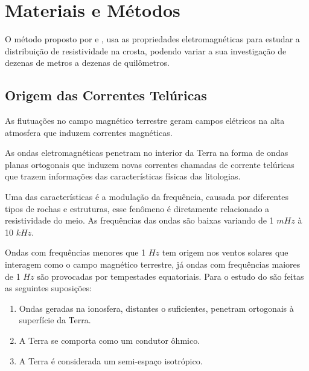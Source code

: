 \chapter{Materiais e Métodos}
    \label{cap-materiais}    
    
    O método \MT proposto por \citeauthor{tikhonov50} \citeyearpar{tikhonov50} e
    \citeauthor{cagniard53} \citeyearpar{cagniard53}, usa as propriedades
    eletromagnéticas para estudar a distribuição de resistividade na crosta, 
    podendo variar a sua investigação de dezenas de metros a dezenas de 
    quilômetros.
    
    \section{Origem das Correntes Telúricas}
    
    As flutuações no campo magnético terrestre geram campos elétricos na alta atmosfera que induzem correntes magnéticas.
    
    As ondas eletromagnéticas penetram no interior da Terra na forma de ondas planas ortogonais que induzem novas correntes chamadas de corrente telúricas que trazem informações das características físicas das litologias. 
    
    Uma das características é a modulação da frequência, causada por diferentes tipos de rochas e estruturas, esse fenômeno é diretamente 
	relacionado a resistividade do meio. As frequências das ondas são baixas variando de 1 $mHz$ à 10 $kHz$.
	
	Ondas com frequências menores que 1 $Hz$ tem origem nos ventos solares que interagem como o campo magnético terrestre, já ondas com frequências maiores de 1 $Hz$ são provocadas por tempestades equatoriais. Para o estudo do \MT são feitas as seguintes suposições:
    
    \begin{enumerate}
	    \item Ondas geradas na ionosfera, distantes o suficientes, penetram ortogonais à superfície da Terra.	    
	    \item A Terra se comporta como um condutor ôhmico.
	    \item A Terra é considerada um semi-espaço isotrópico.
	\end{enumerate}   
    
    
